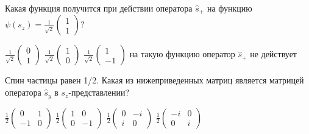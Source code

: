 \documentclass[11pt,a4paper]{exam}
\begin{document}
\begin{questions}
\question Какая функция получится при действии оператора ${\hat s_ + }$ на функцию $\psi ({s_z}) = \frac{1}{{\sqrt 2 }}\left( {\begin{array}{*{20}{c}}
1\\
1
\end{array}} \right)$?
\begin{choices}
\choice $\frac{1}{{\sqrt 2 }}\left( {\begin{array}{*{20}{c}}
0\\
1
\end{array}} \right)$   
\choice $\frac{1}{{\sqrt 2 }}\left( {\begin{array}{*{20}{c}}
1\\
0
\end{array}} \right)$   
\choice $\frac{1}{{\sqrt 2 }}\left( {\begin{array}{*{20}{c}}
1\\
{ - 1}
\end{array}} \right)$   
\choice на такую функцию оператор ${\hat s_ + }$ не действует
\end{choices}

\question Спин частицы равен 1/2. Какая из нижеприведенных матриц является матрицей оператора ${\hat s_y}$ в ${s_z}$-представлении?
\begin{choices}
\choice $\frac{1}{2}\left( {\begin{array}{*{20}{c}}
0&1\\
{ - 1}&0
\end{array}} \right)$      
\choice $\frac{1}{2}\left( {\begin{array}{*{20}{c}}
1&0\\
0&{ - 1}
\end{array}} \right)$      
\choice $\frac{1}{2}\left( {\begin{array}{*{20}{c}}
0&{ - i}\\
i&0
\end{array}} \right)$      
\choice $\frac{1}{2}\left( {\begin{array}{*{20}{c}}
{ - i}&0\\
0&i
\end{array}} \right)$
\end{choices}


\end{questions}
\end{document}

